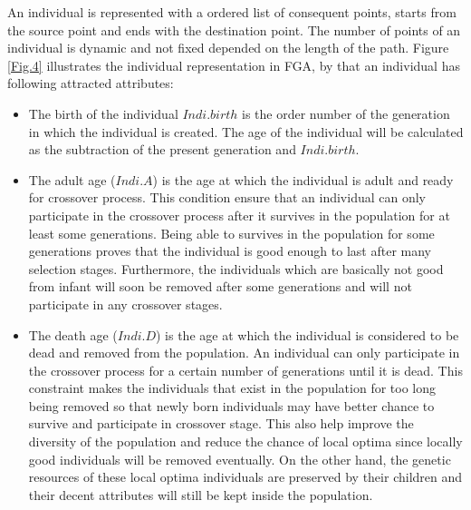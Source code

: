 \documentclass[final]{elsarticle}
\begin{document}
An individual is represented with a ordered list of consequent points, starts from the source point and ends with the destination point. The number of points of an individual is dynamic and not fixed depended on the length of the path. Figure \ref{Fig.4} illustrates the individual representation in FGA, by that an individual has following attracted attributes: \\
\begin{itemize}
	\item The birth of the individual $Indi.birth$ is the order number of the generation in which the individual is created. The age of the individual will be calculated as the subtraction of the present generation and $Indi.birth$.
	\item The adult age ($Indi.A$) is the age at which the individual is adult and ready for crossover process. This condition ensure that an individual can only participate in the crossover process after it survives in the population for at least some generations. Being able to survives in the population for some generations proves that the individual is good enough to last after many selection stages. Furthermore, the individuals which are basically not good from infant will soon be removed after some generations and will not participate in any crossover stages.
	\item The death age ($Indi.D$) is the age at which the individual is considered to be dead and removed from the population. An individual can only participate in the crossover process for a certain number of generations until it is dead. This constraint makes the individuals that exist in the population for too long being removed so that newly born individuals may have better chance to survive and participate in crossover stage. This also help improve the diversity of the population and reduce the chance of local optima since locally good individuals will be removed eventually. On the other hand, the genetic resources of these local optima individuals are preserved by their children and their decent attributes will still be kept inside the population.
\end{itemize}
\end{document}
